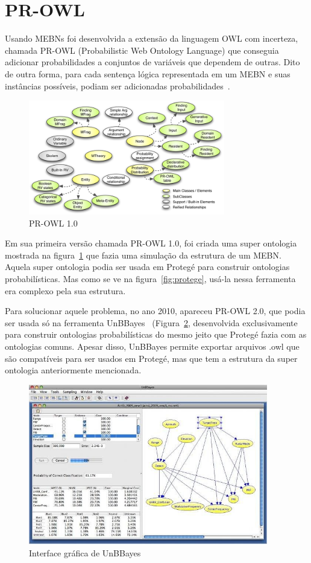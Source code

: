 \section{PR-OWL}
\label{sec:pr_owl}

Usando MEBNs foi desenvolvida a extensão da linguagem OWL com incerteza, chamada PR-OWL (Probabilistic Web Ontology Language) que conseguia adicionar probabilidades a conjuntos de variáveis que dependem de outras. Dito de outra forma, para cada sentença lógica representada em um MEBN e suas instâncias possíveis, podiam ser adicionadas probabilidades~\cite{Prowl10}.

\begin{figure}[h]
	\centering
	\includegraphics[height=5cm]{./images/prowl1}
	\caption{PR-OWL 1.0}
	\label{fig:prowl1}
\end{figure}

Em sua primeira versão chamada PR-OWL 1.0, foi criada uma super ontologia mostrada na figura~\ref{fig:prowl1} que fazia uma simulação da estrutura de um MEBN. Aquela super ontologia podia ser usada em Protegé para construir ontologias probabilísticas. Mas como se ve na figura~\ref{fig:protege}, usá-la nessa ferramenta era complexo pela sua estrutura.

Para solucionar aquele problema, no ano 2010, apareceu PR-OWL 2.0, que podia ser usada só na ferramenta UnBBayes~\cite{UnBBayes08} (Figura~\ref{fig:unbbayes}, desenvolvida exclusivamente para construir ontologias probabilísticas do mesmo jeito que Protegé fazia com as ontologias comuns. Apesar disso, UnBBayes permite exportar arquivos .owl que são compatíveis para ser usados em Protegé, mas que tem a estrutura da super ontologia anteriormente mencionada.

\begin{figure}[h]
	\centering
	\includegraphics[height=7cm]{./images/unbbayes}
	\caption{Interface gráfica de UnBBayes}
	\label{fig:unbbayes}
\end{figure}